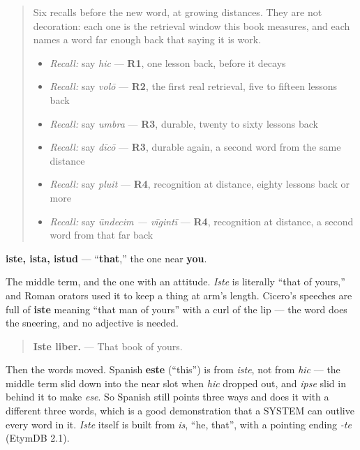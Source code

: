 \label{lesson:LA-C50-iste}



\begin{quote}
Six recalls before the new word, at growing distances. They are not decoration: each one is the retrieval window this book measures, and each names a word far enough back that saying it is work.

\begin{itemize}
\raggedright
  \item \emph{Recall:} say \emph{hic} — \textbf{R1}, one lesson back, before it decays
  \item \emph{Recall:} say \emph{volō} — \textbf{R2}, the first real retrieval, five to fifteen lessons back
  \item \emph{Recall:} say \emph{umbra} — \textbf{R3}, durable, twenty to sixty lessons back
  \item \emph{Recall:} say \emph{dīcō} — \textbf{R3}, durable again, a second word from the same distance
  \item \emph{Recall:} say \emph{pluit} — \textbf{R4}, recognition at distance, eighty lessons back or more
  \item \emph{Recall:} say \emph{ūndecim — vīgintī} — \textbf{R4}, recognition at distance, a second word from that far back
\end{itemize}
\end{quote}

\begin{cousinweb}
\textbf{iste, ista, istud} — \textquotedblleft{}\textbf{that},\textquotedblright{} the one near \textbf{you}.

The middle term, and the one with an attitude. \emph{Iste} is literally \textquotedblleft{}that of yours,\textquotedblright{} and Roman orators used it to keep a thing at arm's length. Cicero's speeches are full of \textbf{iste} meaning \textquotedblleft{}that man of yours\textquotedblright{} with a curl of the lip — the word does the sneering, and no adjective is needed.

\begin{quote}
\textbf{Iste liber.} — That book of yours.
\end{quote}

Then the words moved. Spanish \textbf{este} (\textquotedblleft{}this\textquotedblright{}) is from \emph{iste}, not from \emph{hic} — the middle term slid down into the near slot when \emph{hic} dropped out, and \emph{ipse} slid in behind it to make \emph{ese}. So Spanish still points three ways and does it with a different three words, which is a good demonstration that a SYSTEM can outlive every word in it. \emph{Iste} itself is built from \emph{is}, \textquotedblleft{}he, that\textquotedblright{}, with a pointing ending \emph{-te} (EtymDB 2.1).
\end{cousinweb}

